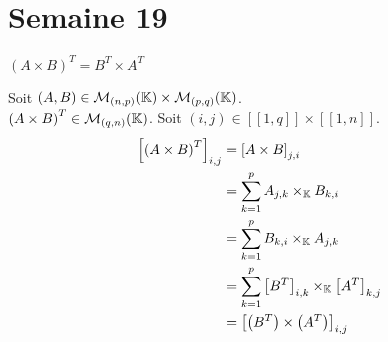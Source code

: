 \documentclass{article}
\renewenvironment{question_kholle}[2][ ]
{
	\subsection{\texorpdfstring{#2}{}}
	\notblank{#1}
	{
		\noindent #1
		\bigbreak
	}
	{}
	\begin{proof}
}
{
	\end{proof}
}
\begin{document}
\pagebreak\section{Semaine 19}
	
		{$\left(A \times B\right)^T = B^T \times A^T$}
		
		Soit $(A, B) \in \mathcal{M}_{(n,p)}(\mathbb K) \times \mathcal{M}_{(p,q)}(\mathbb K)$. \\
		$\left(A \times B\right)^T \in \mathcal{M}_{(q,n)}(\mathbb K)$. Soit $(i, j) \in [\![1,q]\!] \!\times\! [\![1,n]\!]$.
		\begin{equation*}
			\begin{aligned}
				\left[ \left(A \times B\right)^T \right]_{i,j}
				&= \left[A \times B\right]_{j,i} \\
				&= \sum_{k=1}^{p} A_{j,k} \times_{\mathbb K} B_{k,i} \\
				&= \sum_{k=1}^{p} B_{k,i} \times_{\mathbb K} A_{j,k} \\
				&= \sum_{k=1}^{p} \left[B^T\right]_{i,k} \times_{\mathbb K} \left[A^T\right]_{k,j} \\
				&= \left[ \left(B^T\right) \times \left(A^T\right) \right]_{i,j}
			\end{aligned}
		\end{equation*}
	\end{question_kholle}
	
\end{document}
